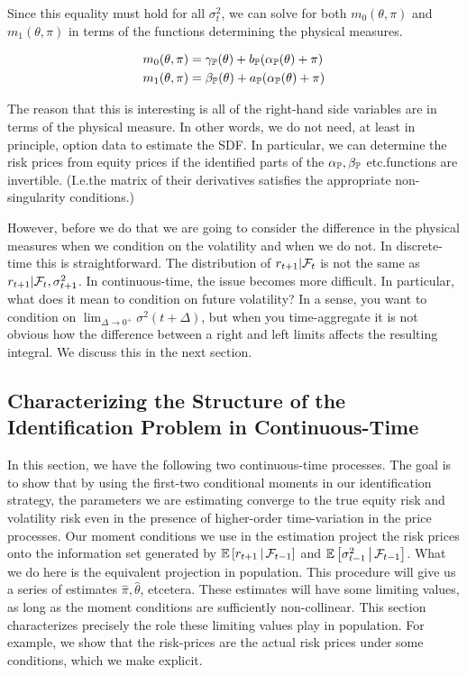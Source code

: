 \documentclass[11pt, letterpaper, twoside, final]{article}
\begin{document}
Since this equality must hold for all $\sigma^2_{t}$, we can solve for both $m_0(\theta, \pi)$ and $m_1(\theta,
\pi)$ in terms of the functions determining the physical measures.

\begin{align}
    m_0(\theta, \pi)  &= \gamma_{\mathbb{P}}(\theta) + b_{\mathbb{P}}(\alpha_{\mathbb{P}}(\theta) + \pi) \\
    m_1(\theta, \pi)  &= \beta_{\mathbb{P}}(\theta) + a_{\mathbb{P}}(\alpha_{\mathbb{P}}(\theta) + \pi) 
\end{align}

The reason that this is interesting is all of the right-hand side variables  are in terms of the physical
measure.
In other words, we do not need, at least in principle, option data to estimate the SDF.
In particular, we can determine the risk prices from equity prices if the identified parts of the $\alpha_{\mathbb{P}},
\beta_{\mathbb{P}}$ etc.\@ functions are  invertible.
(I.e.\@ the matrix of their derivatives satisfies the appropriate non-singularity conditions.)

However, before we do that we are going to consider the difference in the physical measures when we condition on
the volatility and when we do not.
In discrete-time this is straightforward.
The distribution of $ r_{t+1} \vert \mathcal{F}_t$ is not the same as $r_{t+1} \vert \mathcal{F}_t, \sigma^2_{t+1}$.
In continuous-time, the issue becomes more difficult.
In particular, what does it mean to condition on future volatility? 
In a sense, you want to condition on $\lim_{\Delta \to 0^{+}} \sigma^2(t+\Delta)$, but when you time-aggregate
it is not obvious how the difference between a right and left limits affects the resulting integral.
We discuss this in the next section.

\subsection{Characterizing the Structure of the Identification Problem in Continuous-Time}

In this section, we have the following two continuous-time processes.
The goal is to show that by using the first-two conditional moments in our identification strategy, the parameters
we are estimating converge to the true equity risk and volatility risk even in the presence of higher-order
time-variation in the price processes.
Our moment conditions we use in the estimation project the risk prices onto the information set generated by
$\operatorname{\mathbb{E}}\left[r_{t+1}\,\middle\vert\, \mathcal{F}_{t-1}\right]$  and $\operatorname{\mathbb{E}}\left[\sigma^2_{t-1} \,\middle\vert\, \mathcal{F}_{t-1}\right]$.
What we do here is the equivalent projection in population.
This procedure will give us a series of estimates $\hat{\pi}, \hat{\theta}$, etcetera.
These estimates will have some limiting values, as long as the moment conditions are sufficiently non-collinear.
This section characterizes precisely the role these limiting values play in population.
For example, we show that the risk-prices are the actual risk prices under some conditions, which we make
explicit.
\end{document}
